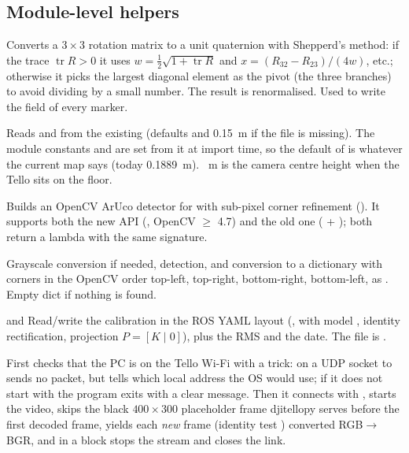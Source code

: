 \subsection{Module-level helpers}

Converts a $3\times3$ rotation matrix to a unit quaternion with Shepperd's method: if the trace
$\operatorname{tr}R > 0$ it uses $w = \tfrac12\sqrt{1+\operatorname{tr}R}$ and
$x = (R_{32}-R_{23})/(4w)$, etc.; otherwise it picks the largest diagonal element as the pivot (the three
 branches) to avoid dividing by a small number. The result is renormalised. Used to write the
 field of every marker.

Reads  and  from the existing  (defaults
 and 0.15~m if the file is missing). The module constants  and 
are set from it at import time, so the default  of  is whatever the current map says
(today 0.1889~m). ~m is the camera centre height when the Tello sits on the floor.

Builds an OpenCV ArUco detector for  with sub-pixel corner refinement
(). It supports both the new API (, OpenCV $\geq$ 4.7)
and the old one ( + ); both return a lambda with the same
signature.

Grayscale conversion if needed, detection, and conversion to a dictionary  with corners in
the OpenCV order top-left, top-right, bottom-right, bottom-left, as . Empty dict if nothing is found.

 and 
Read/write the calibration in the ROS  YAML layout (,
 with model , identity rectification, projection
$P = [K \mid 0]$), plus the RMS and the date. The file is .

First checks that the PC is on the Tello Wi-Fi with a trick:  on a UDP socket to
 sends no packet, but tells which local address the OS would use; if it does not start
with  the program exits with a clear message. Then it connects with ,
starts the video, skips the black $400\times300$ placeholder frame djitellopy serves before the first decoded
frame, yields each \emph{new} frame (identity test ) converted RGB$\to$BGR, and in a
 block stops the stream and closes the link.

